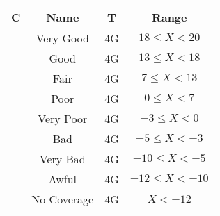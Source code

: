 \begin{tabular}{|c|c|c|c|}\hline
\rowcolor{Plum!20}
C&Name&T&Range\\\hline\hline
\rowcolor{White}\cellcolor[HTML]{00a032} &Very Good&4G&$18\leq X<20$\\\hline
\rowcolor{Gray!20}\cellcolor[HTML]{00d228} &Good&4G&$13\leq X<18$\\\hline
\rowcolor{White}\cellcolor[HTML]{ffff00} &Fair&4G&$7\leq X<13$\\\hline
\rowcolor{Gray!20}\cellcolor[HTML]{ffaa00} &Poor&4G&$0\leq X<7$\\\hline
\rowcolor{White}\cellcolor[HTML]{fa6400} &Very Poor&4G&$-3\leq X<0$\\\hline
\rowcolor{Gray!20}\cellcolor[HTML]{ff0000} &Bad&4G&$-5\leq X<-3$\\\hline
\rowcolor{White}\cellcolor[HTML]{dc143c} &Very Bad&4G&$-10\leq X<-5$\\\hline
\rowcolor{Gray!20}\cellcolor[HTML]{820000} &Awful&4G&$-12\leq X<-10$\\\hline
\rowcolor{White}\cellcolor[HTML]{aaaaaa} &No Coverage&4G&$X<-12$\\\hline
\end{tabular}
